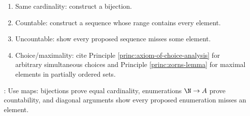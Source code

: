 \begin{method} \label{meth:cardinality-proof-patterns}\label{meth:cardinality-proof-patterns-source-todo} 
\begin{enumerate}[label=(\roman*)]
\setlength{\itemsep}{0pt}
\item Same cardinality: construct a bijection.
\item Countable: construct a sequence whose range contains every element.
\item Uncountable: show every proposed sequence misses some element.
\item Choice/maximality: cite Principle \ref{princ:axiom-of-choice-analysis} for arbitrary simultaneous choices and Principle \ref{princ:zorns-lemma} for maximal elements in partially ordered sets.
\end{enumerate}
: Use maps: bijections prove equal cardinality, enumerations $\N\to A$ prove countability, and diagonal arguments show every proposed enumeration misses an element.
\end{method}
